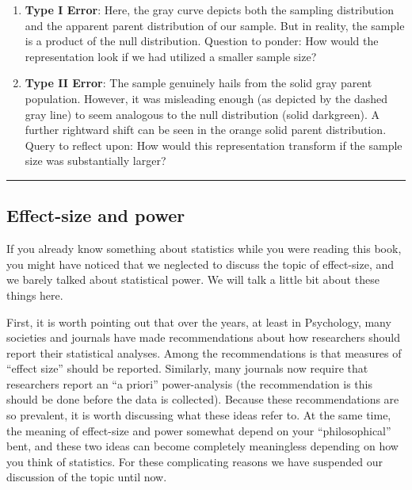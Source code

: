 \documentclass[
  letterpaper,
  DIV=11,
  numbers=noendperiod]{scrartcl}
\begin{document}
\begin{enumerate}
\def\labelenumi{\arabic{enumi}.}
\setcounter{enumi}{4}
\item
  \textbf{Type I Error}: Here, the gray curve depicts both the sampling
  distribution and the apparent parent distribution of our sample. But
  in reality, the sample is a product of the null distribution. Question
  to ponder: How would the representation look if we had utilized a
  smaller sample size?
\item
  \textbf{Type II Error}: The sample genuinely hails from the solid gray
  parent population. However, it was misleading enough (as depicted by
  the dashed gray line) to seem analogous to the null distribution
  (solid darkgreen). A further rightward shift can be seen in the orange
  solid parent distribution. Query to reflect upon: How would this
  representation transform if the sample size was substantially larger?
\end{enumerate}

\begin{center}\rule{0.5\linewidth}{0.5pt}\end{center}

\hypertarget{effect-size-and-power}{%
\subsection{Effect-size and power}\label{effect-size-and-power}}

If you already know something about statistics while you were reading
this book, you might have noticed that we neglected to discuss the topic
of effect-size, and we barely talked about statistical power. We will
talk a little bit about these things here.

First, it is worth pointing out that over the years, at least in
Psychology, many societies and journals have made recommendations about
how researchers should report their statistical analyses. Among the
recommendations is that measures of ``effect size'' should be reported.
Similarly, many journals now require that researchers report an ``a
priori'' power-analysis (the recommendation is this should be done
before the data is collected). Because these recommendations are so
prevalent, it is worth discussing what these ideas refer to. At the same
time, the meaning of effect-size and power somewhat depend on your
``philosophical'' bent, and these two ideas can become completely
meaningless depending on how you think of statistics. For these
complicating reasons we have suspended our discussion of the topic until
now.
\end{document}
